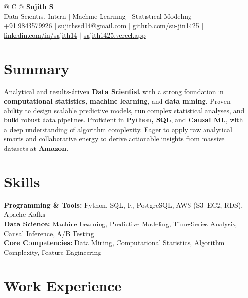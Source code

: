 \documentclass[a4paper,10pt]{article}
\newcommand{\ulink}[2]{\href{#1}{#2}}
\begin{document}
\pagestyle{empty}

\begin{tabularx}{\linewidth}{@{} C @{}}
{\color[HTML]{000000}\fontsize{30}{35}\selectfont\bfseries Sujith S} \\[5pt]
{\fontsize{10.5}{12.5}\selectfont\color[HTML]{3A3A3A}
Data Scientist Intern $|$ Machine Learning $|$ Statistical Modeling} \\[6pt]
{\fontsize{9.5}{11.5}\selectfont\textcolor[HTML]{3A3A3A}{+91 9843579926 $|$ sujithssd14@gmail.com $|$ \ulink{https://github.com/su-jin1425}{github.com/su-jin1425} $|$ \ulink{https://linkedin.com/in/sujith14}{linkedin.com/in/sujith14} $|$ \ulink{https://sujith1425.vercel.app}{sujith1425.vercel.app}}}
\end{tabularx}

\section{Summary}
\vspace{2pt}

{\color[HTML]{0A0A0A}\fontsize{11}{14}\selectfont
Analytical and results-driven \textbf{Data Scientist} with a strong foundation in \textbf{computational statistics, machine learning}, and \textbf{data mining}. Proven ability to design scalable predictive models, run complex statistical analyses, and build robust data pipelines. Proficient in \textbf{Python, SQL}, and \textbf{Causal ML}, with a deep understanding of algorithm complexity. Eager to apply raw analytical smarts and collaborative energy to derive actionable insights from massive datasets at \textbf{Amazon}.}

\section{Skills}
\vspace{2pt}

{\color[HTML]{0A0A0A}\fontsize{11}{14}\selectfont
\textbf{Programming \& Tools:} Python, SQL, R, PostgreSQL, AWS (S3, EC2, RDS), Apache Kafka \\[2pt]
\textbf{Data Science:} Machine Learning, Predictive Modeling, Time-Series Analysis, Causal Inference, A/B Testing \\[2pt]
\textbf{Core Competencies:} Data Mining, Computational Statistics, Algorithm Complexity, Feature Engineering}

\section{Work Experience}
\vspace{2pt}
\end{document}
